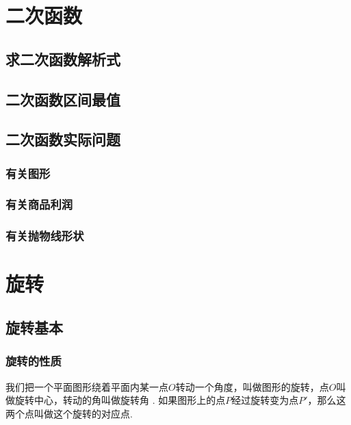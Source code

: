 \documentclass[lang=cn, 10pt, titlestyle=display, oneside, toc=twocol]{elegantbook}
\begin{document}
\chapter{二次函数}



\section{求二次函数解析式}

\section{二次函数区间最值}

\section{二次函数实际问题}


\subsection*{有关图形}

\subsection*{有关商品利润}

\subsection*{有关抛物线形状}

\chapter{旋转}

\section{旋转基本}

\subsection{旋转的性质}

我们把一个平面图形绕着平面内某一点\(O \)转动一个角度，叫做图形的旋转，点\(O \)叫做旋转中心，转动的角叫做旋转角 . 如果图形上的点\(P \)经过旋转变为点\(P' \)，那么这两个点叫做这个旋转的对应点.
\end{document}
